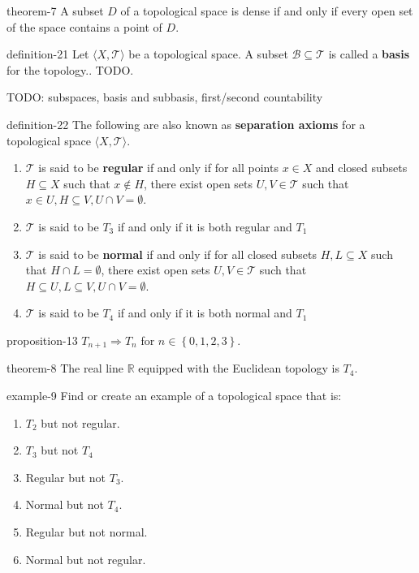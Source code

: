 \documentclass[10pt,]{article}
\newcommand{\terminology}[1]{\textbf{#1}}
\newcommand{\tuple}[1]{\langle #1 \rangle}
\newcommand{\mb}{\mathbb}
\newcommand{\mc}{\mathcal}
\newcommand{\setList}[1]{\left\{#1\right\}}
\begin{document}
\begin{theorem}{}{}{theorem-7}%
\hypertarget{p-67}{}%
A subset \(D\) of a topological space is dense if and only if every open set of the space contains a point of \(D\).%
\end{theorem}
\begin{definition}{}{definition-21}%
\hypertarget{p-68}{}%
Let \(\tuple{X,\mc T}\) be a topological space. A subset \(\mc B\subseteq\mc T\) is called a \terminology{basis} for the topology.. TODO.%
\end{definition}
\hypertarget{p-69}{}%
TODO: subspaces, basis and subbasis, first/second countability%
\begin{definition}{}{definition-22}%
\hypertarget{p-70}{}%
The following are also known as \terminology{separation axioms} for a topological space \(\tuple{X,\mc T}\).%
\leavevmode%
\begin{enumerate}
\item\hypertarget{li-59}{}\(\mc T\) is said to be \terminology{regular} if and only if for all points \(x\in X\) and closed subsets \(H\subseteq X\) such that \(x\not\in H\), there exist open sets \(U,V\in\mc T\) such that \(x\in U,H\subseteq V,U\cap V=\emptyset\).%
\item\hypertarget{li-60}{}\(\mc T\) is said to be \terminology{\(T_3\)} if and only if it is both regular and \(T_1\)%
\item\hypertarget{li-61}{}\(\mc T\) is said to be \terminology{normal} if and only if for all closed subsets \(H,L\subseteq X\) such that \(H\cap L=\emptyset\), there exist open sets \(U,V\in\mc T\) such that \(H\subseteq U,L\subseteq V,U\cap V=\emptyset\).%
\item\hypertarget{li-62}{}\(\mc T\) is said to be \terminology{\(T_4\)} if and only if it is both normal and \(T_1\)%
\end{enumerate}
\end{definition}
\begin{proposition}{}{}{proposition-13}%
\hypertarget{p-71}{}%
\(T_{n+1}\Rightarrow T_n\) for \(n\in\setList{0,1,2,3}\).%
\end{proposition}
\begin{theorem}{}{}{theorem-8}%
\hypertarget{p-72}{}%
The real line \(\mb R\) equipped with the Euclidean topology is \(T_4\).%
\end{theorem}
\begin{example}{}{example-9}%
\hypertarget{p-73}{}%
Find or create an example of a topological space that is:%
\leavevmode%
\begin{enumerate}
\item\hypertarget{li-63}{}\(T_2\) but not regular.%
\item\hypertarget{li-64}{}\(T_3\) but not \(T_4\)%
\item\hypertarget{li-65}{}Regular but not \(T_3\).%
\item\hypertarget{li-66}{}Normal but not \(T_4\).%
\item\hypertarget{li-67}{}Regular but not normal.%
\item\hypertarget{li-68}{}Normal but not regular.%
\end{enumerate}
\end{example}
\end{document}
